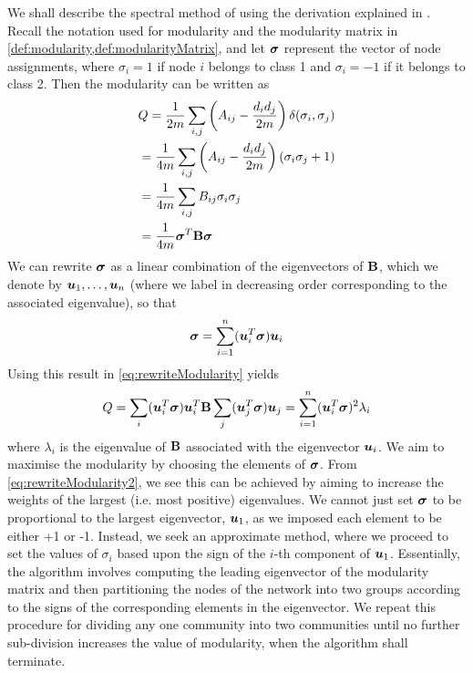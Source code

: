 We shall describe the spectral method of \cite{New06a} using the derivation explained in \cite{New06a,New06b,For10}.
Recall the notation used for modularity and the modularity matrix in \cref{def:modularity,def:modularityMatrix}, and let $\vecvar{\sigma}$ represent the vector of node assignments, where $\sigma_{i} = 1$ if node $i$ belongs to class 1 and $\sigma_{i} = -1$ if it belongs to class 2.
Then the modularity can be written as
\begin{equation}
	\label{eq:rewriteModularity}
	\begin{split}
		&Q = \frac{1}{2m} \sum_{i,j} \left(A_{ij} - \frac{d_{i}d_{j}}{2m} \right) \delta(\sigma_{i},\sigma_{j}) \\
		&= \frac{1}{4m} \sum_{i,j} \left(A_{ij} - \frac{d_{i}d_{j}}{2m} \right) (\sigma_{i}\sigma_{j} + 1) \\
		&= \frac{1}{4m} \sum_{i,j} B_{ij} \sigma_{i} \sigma_{j} \\
		&= \frac{1}{4m} \transpose{\vecvar{\sigma}} \matvar{B} \vecvar{\sigma}
	\end{split}
\end{equation}
We can rewrite $\vecvar{\sigma}$ as a linear combination of the eigenvectors of $\mathbf B$, which we denote by $\vecvar{u}_{1},\dots,\vecvar{u}_{n}$ (where we label in decreasing order corresponding to the associated eigenvalue), so that
\begin{equation}
	\label{eq:rewriteNodeAssignments}
	\vecvar{\sigma} = \sum_{i=1}^{n} (\transpose{\vecvar{u}_{i}} \vecvar{\sigma}) \vecvar{u}_{i}
\end{equation}
Using this result in \cref{eq:rewriteModularity} yields
\begin{equation}
	\label{eq:rewriteModularity2}
	Q = \sum_{i} (\transpose{\vecvar{u}_{i}} \vecvar{\sigma}) \transpose{\vecvar{u}_{i}} \matvar{B} \sum_{j} (\transpose{\vecvar{u}_{j}} \vecvar{\sigma}) \vecvar{u}_{j} = \sum_{i=1}^{n} (\transpose{\vecvar{u}_{i}} \vecvar{\sigma})^{2} \lambda_{i}
\end{equation}
where $\lambda_{i}$ is the eigenvalue of $\mathbf B$ associated with the eigenvector $\vecvar{u}_{i}$.
We aim to maximise the modularity by choosing the elements of $\vecvar{\sigma}$. From \cref{eq:rewriteModularity2}, we see this can be achieved by aiming to increase the weights of the largest (i.e. most positive) eigenvalues.
We cannot just set $\vecvar{\sigma}$ to be proportional to the largest eigenvector, $\vecvar{u}_{1}$, as we imposed each element to be either +1 or -1.
Instead, we seek an approximate method, where we proceed to set the values of $\sigma_{i}$ based upon the sign of the $i$-th component of $\vecvar{u}_{1}$.
Essentially, the algorithm involves computing the leading eigenvector of the modularity matrix and then partitioning the nodes of the network into two groups according to the signs of the corresponding elements in the eigenvector.
We repeat this procedure for dividing any one community into two communities until no further sub-division increases the value of modularity, when the algorithm shall terminate.

